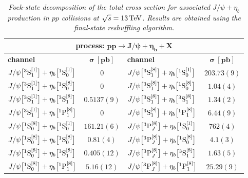 \begin{table}[t!]
\centering
\renewcommand*{\arraystretch}{1.4}
\begin{tabular}[t]{lc||lc}
\toprule \multicolumn{4}{c}{\textbf{process: $\boldsymbol{p p \to J/\psi + \eta_b + X}$}}\\
\toprule
{\textbf{channel}} 
 & {$\boldsymbol{\sigma~[\textbf{pb}]}$} & {\textbf{channel}} 
 & {$\boldsymbol{\sigma~[\textbf{pb}]}$} \\ 
 \midrule
$J/\psi\big[{}^3{\mathrm{S}}_1^{[1]}\big] + \eta_b\big[{}^1{\mathrm{S}}_0^{[1]}\big]$ & {$0$} & $J/\psi\big[{}^3{\mathrm{S}}_1^{[8]}\big] + \eta_b\big[{}^1{\mathrm{S}}_0^{[1]}\big]$ & $203.73(9)$\\ \hdashline
$J/\psi\big[{}^3{\mathrm{S}}_1^{[1]}\big] + \eta_b\big[{}^1{\mathrm{S}}_0^{[8]}\big]$ & {$0$} & $J/\psi\big[{}^3{\mathrm{S}}_1^{[8]}\big] + \eta_b\big[{}^1{\mathrm{S}}_0^{[8]}\big]$ & $1.04(4)$ \\ \hdashline
$J/\psi\big[{}^3{\mathrm{S}}_1^{[1]}\big] + \eta_b\big[{}^3{\mathrm{S}}_1^{[8]}\big]$ & $0.5137(9)$
& $J/\psi\big[{}^3{\mathrm{S}}_1^{[8]}\big] + \eta_b\big[{}^3{\mathrm{S}}_1^{[8]}\big]$ & $1.34(2)$ \\ \hdashline
$J/\psi\big[{}^3{\mathrm{S}}_1^{[1]}\big] + \eta_b\big[{}^1{\mathrm{P}}_1^{[8]}\big]$ & {$0$} & $J/\psi\big[{}^3{\mathrm{S}}_1^{[8]}\big] + \eta_b\big[{}^1{\mathrm{P}}_1^{[8]}\big]$ & $6.44(9)$ \\ \hdashline
$J/\psi\big[{}^1{\mathrm{S}}_0^{[8]}\big] + \eta_b\big[{}^1{\mathrm{S}}_0^{[1]}\big]$ & $161.21(6)$ & $J/\psi\big[{}^3{\mathrm{P}}_J^{[8]}\big] + \eta_b\big[{}^1{\mathrm{S}}_0^{[1]}\big]$ & $762(4)$ \\ \hdashline
$J/\psi\big[{}^1{\mathrm{S}}_0^{[8]}\big] + \eta_b\big[{}^1{\mathrm{S}}_0^{[8]}\big]$ & $0.81(4)$ & $J/\psi\big[{}^3{\mathrm{P}}_J^{[8]}\big] + \eta_b\big[{}^1{\mathrm{S}}_0^{[8]}\big]$ & $4.1(3)$ \\ \hdashline
$J/\psi\big[{}^1{\mathrm{S}}_0^{[8]}\big] + \eta_b\big[{}^3{\mathrm{S}}_1^{[8]}\big]$ & $0.405(12)$ & $J/\psi\big[{}^3{\mathrm{P}}_J^{[8]}\big] + \eta_b\big[{}^3{\mathrm{S}}_1^{[8]}\big]$ & $1.63(5)$ \\ \hdashline
$J/\psi\big[{}^1{\mathrm{S}}_0^{[8]}\big] + \eta_b\big[{}^1{\mathrm{P}}_1^{[8]}\big]$ & $5.16(12)$ & $J/\psi\big[{}^3{\mathrm{P}}_J^{[8]}\big] + \eta_b\big[{}^1{\mathrm{P}}_1^{[8]}\big]$ & $25.29(9)$ \\ 
\bottomrule
\end{tabular}
\caption{\it\small Fock-state decomposition of the total cross section for associated $J/\psi+\eta_b$ production in $pp$ collisions at $\sqrt{s} = 13\,{\rm TeV}$.
Results are obtained using the final-state reshuffling algorithm.}
\label{tab:sigma_pp2JpsiEtab}
\end{table}

